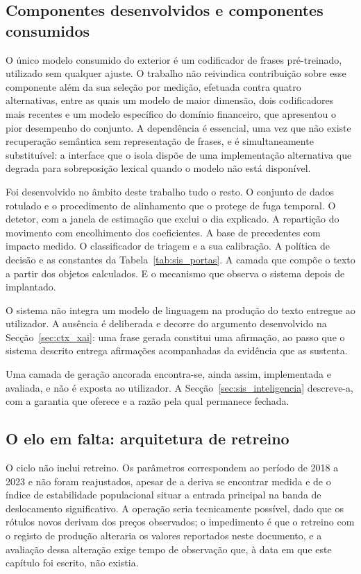 \subsection{Componentes desenvolvidos e componentes consumidos}

O único modelo consumido do exterior é um codificador de frases pré-treinado, utilizado sem
qualquer ajuste. O trabalho não reivindica contribuição sobre esse componente além da sua seleção
por medição, efetuada contra quatro alternativas, entre as quais um modelo de maior dimensão, dois
codificadores mais recentes e um modelo específico do domínio financeiro, que apresentou o pior
desempenho do conjunto. A dependência é essencial, uma vez que não existe recuperação semântica
sem representação de frases, e é simultaneamente substituível: a interface que o isola dispõe de
uma implementação alternativa que degrada para sobreposição lexical quando o modelo não está
disponível.

Foi desenvolvido no âmbito deste trabalho tudo o resto. O conjunto de dados rotulado e o
procedimento de alinhamento que o protege de fuga temporal. O detetor, com a janela de estimação
que exclui o dia explicado. A repartição do movimento com encolhimento dos coeficientes. A base de
precedentes com impacto medido. O classificador de triagem e a sua calibração. A política de
decisão e as constantes da Tabela~\ref{tab:sis_portas}. A camada que compõe o texto a partir dos
objetos calculados. E o mecanismo que observa o sistema depois de implantado.

O sistema não integra um modelo de linguagem na produção do texto entregue ao utilizador. A
ausência é deliberada e decorre do argumento desenvolvido na Secção~\ref{sec:ctx_xai}: uma frase
gerada constitui uma afirmação, ao passo que o sistema descrito entrega afirmações acompanhadas da
evidência que as sustenta.

Uma camada de geração ancorada encontra-se, ainda assim, implementada e avaliada, e não é
exposta ao utilizador. A Secção~\ref{sec:sis_inteligencia} descreve-a, com a garantia que oferece
e a razão pela qual permanece fechada.

\subsection{O elo em falta: arquitetura de retreino}

O ciclo não inclui retreino. Os parâmetros correspondem ao período de 2018 a 2023 e não foram
reajustados, apesar de a deriva se encontrar medida e de o índice de estabilidade populacional
situar a entrada principal na banda de deslocamento significativo. A operação seria tecnicamente
possível, dado que os rótulos novos derivam dos preços observados; o impedimento é que o retreino
com o registo de produção alteraria os valores reportados neste documento, e a avaliação dessa
alteração exige tempo de observação que, à data em que este capítulo foi escrito, não existia.

